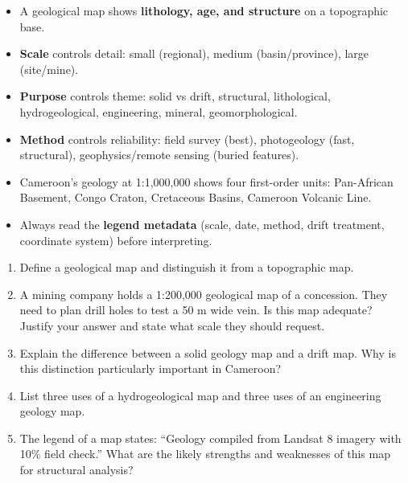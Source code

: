\documentclass[11pt]{article}
\begin{document}
\begin{aretenir}
\begin{itemize}
\item A geological map shows \textbf{lithology, age, and structure} on a topographic base.
\item \textbf{Scale} controls detail: small (regional), medium (basin/province), large (site/mine).
\item \textbf{Purpose} controls theme: solid vs drift, structural, lithological, hydrogeological, engineering, mineral, geomorphological.
\item \textbf{Method} controls reliability: field survey (best), photogeology (fast, structural), geophysics/remote sensing (buried features).
\item Cameroon's geology at 1:1,000,000 shows four first-order units: Pan-African Basement, Congo Craton, Cretaceous Basins, Cameroon Volcanic Line.
\item Always read the \textbf{legend metadata} (scale, date, method, drift treatment, coordinate system) before interpreting.
\end{itemize}
\end{aretenir}

\begin{exercice}
\begin{enumerate}
\item Define a geological map and distinguish it from a topographic map.
\item A mining company holds a 1:200,000 geological map of a concession. They need to plan drill holes to test a 50 m wide vein. Is this map adequate? Justify your answer and state what scale they should request.
\item Explain the difference between a solid geology map and a drift map. Why is this distinction particularly important in Cameroon?
\item List three uses of a hydrogeological map and three uses of an engineering geology map.
\item The legend of a map states: ``Geology compiled from Landsat 8 imagery with 10\% field check.'' What are the likely strengths and weaknesses of this map for structural analysis?
\end{enumerate}
\end{exercice}
\end{document}

